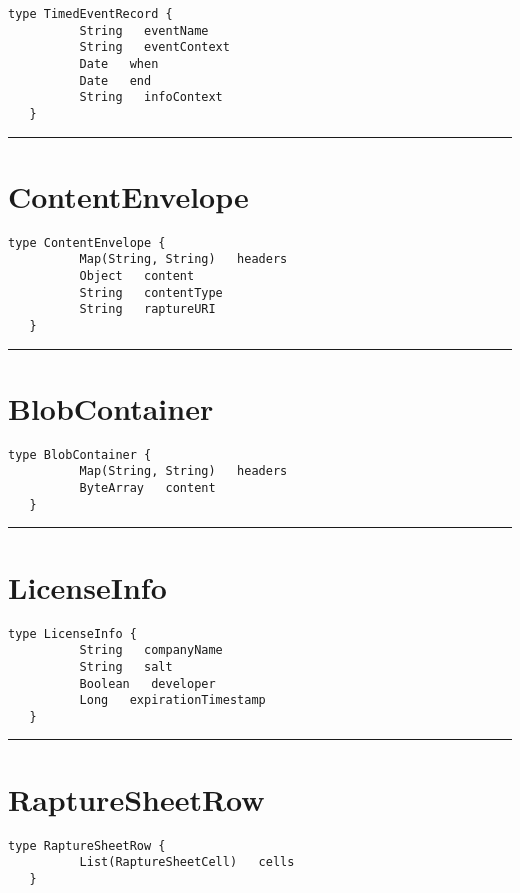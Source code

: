 \begin{lstlisting}[style=nonumbers]
   type TimedEventRecord {
          String   eventName
          String   eventContext
          Date   when
          Date   end
          String   infoContext
   }
\end{lstlisting}

\rule{12cm}{2pt}
\section{ContentEnvelope}
\label{type:ContentEnvelope}

\begin{lstlisting}[style=nonumbers]
   type ContentEnvelope {
          Map(String, String)   headers
          Object   content
          String   contentType
          String   raptureURI
   }
\end{lstlisting}

\rule{12cm}{2pt}
\section{BlobContainer}
\label{type:BlobContainer}

\begin{lstlisting}[style=nonumbers]
   type BlobContainer {
          Map(String, String)   headers
          ByteArray   content
   }
\end{lstlisting}

\rule{12cm}{2pt}
\section{LicenseInfo}
\label{type:LicenseInfo}

\begin{lstlisting}[style=nonumbers]
   type LicenseInfo {
          String   companyName
          String   salt
          Boolean   developer
          Long   expirationTimestamp
   }
\end{lstlisting}

\rule{12cm}{2pt}
\section{RaptureSheetRow}
\label{type:RaptureSheetRow}

\begin{lstlisting}[style=nonumbers]
   type RaptureSheetRow {
          List(RaptureSheetCell)   cells
   }
\end{lstlisting}

